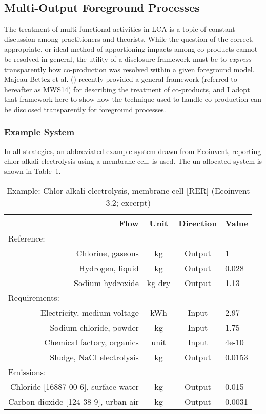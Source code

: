 \subsection{Multi-Output Foreground Processes}

The treatment of multi-functional activities in LCA is a topic of constant discussion among practitioners and theorists.  While the question of the correct, appropriate, or ideal method of apportioning impacts among co-products cannot be resolved in general, the utility of a disclosure framework must be to \textit{express} transparently how co-production was resolved within a given foreground model.  Majeau-Bettez et al. (\citeyear{Majeau_Bettez_2014}) recently provided a general framework (referred to hereafter as MWS14) for describing the treatment of co-products, and I adopt that framework here to show how the technique used to handle co-production can be disclosed transparently for foreground processes.

\subsubsection{Example System}

In all strategies, an abbreviated example system drawn from Ecoinvent, reporting chlor-alkali electrolysis using a membrane cell, is used.  The un-allocated system is shown in Table~\ref{tbl:chlor-alkali}.

\begin{table}
  \begin{center}
  \caption{Example: Chlor-alkali electrolysis, membrane cell [RER] (Ecoinvent 3.2; excerpt)}
  \label{tbl:chlor-alkali}
  \begin{tabular}{rccl}
    \toprule
    \bf Flow & \bf Unit & \bf Direction & \bf Value \\
    \midrule
    \multicolumn{4}{l}{Reference:} \\
    Chlorine, gaseous & kg & Output & 1 \\
    Hydrogen, liquid & kg & Output & 0.028 \\
    Sodium hydroxide & kg dry & Output & 1.13 \\
    \midrule
    \multicolumn{4}{l}{Requirements:} \\
    Electricity, medium voltage & kWh & Input & 2.97 \\
    Sodium chloride, powder & kg & Input & 1.75 \\
    Chemical factory, organics & unit & Input & 4e-10 \\
    Sludge, NaCl electrolysis & kg & Output & 0.0153 \\[1ex]
    \multicolumn{4}{l}{Emissions:} \\
    Chloride [16887-00-6], surface water & kg & Output & 0.015 \\
    Carbon dioxide [124-38-9], urban air & kg & Output & 0.0031 \\
    \bottomrule
  \end{tabular}
  \end{center}
\end{table}

